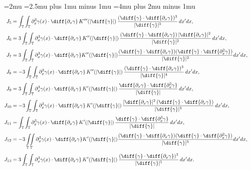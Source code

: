 \documentclass[a4paper]{amsart}
\theoremstyle{definition}
\newcommand{\T}{\ensuremath{\mathbb{T}}}
\newcommand{\intTT}{\ensuremath{\int_\T\int_\T}}
\begin{document}
{\allowdisplaybreaks
\thinmuskip=2mu
\medmuskip=2.5mu plus 1mu minus 1mu
\thickmuskip=4mu plus 2mu minus 1mu
\jot=2pt
\begin{align*}
    J_5 &= \intTT \partial_x^3\gamma(x) \cdot \diff{\partial_x\gamma} \,
            K'''(|\diff{\gamma}|) \, \frac{(\diff{\gamma} \cdot \diff{\partial_x\gamma})^3}{|\diff{\gamma}|^3} \, dx' dx,\\[4pt]
    J_6 &= 3  \intTT  \partial_x^3\gamma(x) \cdot \diff{\partial_x\gamma}  \,
            K''(|\diff{\gamma}|) \, \frac{(\diff{\gamma} \cdot \diff{\partial_x\gamma})\,|\diff{\partial_x\gamma}|^2}{|\diff{\gamma}|^2} \, dx' dx,\\[4pt]
    J_7 &= 3 \intTT  \partial_x^3\gamma(x) \cdot \diff{\partial_x\gamma}
            K''(|\diff{\gamma}|) \frac{(\diff{\gamma} \cdot \diff{\partial_x\gamma})(\diff{\gamma} \cdot \diff{\partial_x^2\gamma})}{|\diff{\gamma}|^2} dx' dx,\\[4pt]
    J_8 &= -3  \intTT  \partial_x^3\gamma(x) \cdot \diff{\partial_x\gamma} \,
            K''(|\diff{\gamma}|) \, \frac{(\diff{\gamma} \cdot \diff{\partial_x\gamma})^3}{|\diff{\gamma}|^4} \, dx' dx,\\[4pt]
    J_9 &= 3 \intTT  \partial_x^3\gamma(x) \cdot \diff{\partial_x\gamma} \,
            K'(|\diff{\gamma}|) \, \frac{\diff{\partial_x\gamma} \cdot \diff{\partial_x^2\gamma}}{|\diff{\gamma}|} \, dx' dx,\\[4pt]
    J_{10} &= -3 \intTT  \partial_x^3\gamma(x) \cdot \diff{\partial_x\gamma} \,
            K'(|\diff{\gamma}|) \, \frac{|\diff{\partial_x\gamma}|^2\,(\diff{\gamma} \cdot \diff{\partial_x\gamma})}{|\diff{\gamma}|^3} \, dx' dx,\\[4pt]
    J_{11} &=  \intTT  \partial_x^3\gamma(x) \cdot \diff{\partial_x\gamma} \,
            K'(|\diff{\gamma}|) \, \frac{\diff{\gamma} \cdot \diff{\partial_x^3\gamma}}{|\diff{\gamma}|} \, dx' dx,\\[4pt]
   J_{12} &= -3 \int\limits_{\mathbb T}\mkern-8mu\int\limits_{\mathbb T} \partial_x^3\gamma(x)\cdot\diff{\partial_x\gamma}
            K'(|\diff{\gamma}|) \frac{(\diff{\gamma}\cdot\diff{\partial_x\gamma})(\diff{\gamma}\cdot\diff{\partial_x^2\gamma})}{|\diff{\gamma}|^3} dx' dx,\\[4pt]
    J_{13} &= 3  \intTT  \partial_x^3\gamma(x) \cdot \diff{\partial_x\gamma}  \,
            K'(|\diff{\gamma}|) \, \frac{(\diff{\gamma} \cdot \diff{\partial_x\gamma})^3}{|\diff{\gamma}|^5} \, dx' dx .
\end{align*}
}
\end{document}
